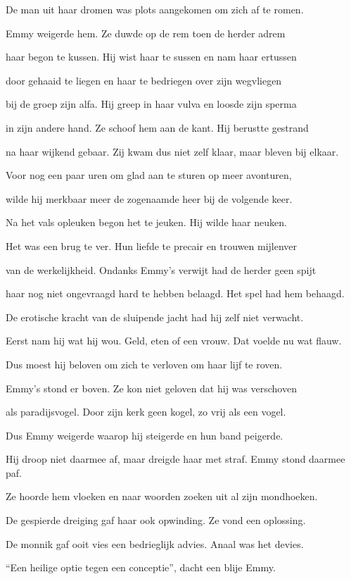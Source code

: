 De man uit haar dromen
was plots aangekomen
om zich af te romen.

Emmy weigerde hem.
Ze duwde op de rem
toen de herder adrem

haar begon te kussen.
Hij wist haar te sussen
en nam haar ertussen

door gehaaid te liegen
en haar te bedriegen
over zijn wegvliegen

bij de groep zijn alfa.
Hij greep in haar vulva
en loosde zijn sperma

in zijn andere hand.
Ze schoof hem aan de kant.
Hij berustte gestrand

na haar wijkend gebaar.
Zij kwam dus niet zelf klaar,
maar bleven bij elkaar.

Voor nog een paar uren
om glad aan te sturen
op meer avonturen,

wilde hij merkbaar meer
de zogenaamde heer
bij de volgende keer.

Na het vals opleuken
begon het te jeuken.
Hij wilde haar neuken.

Het was een brug te ver.
Hun liefde te precair
en trouwen mijlenver

van de werkelijkheid.
Ondanks Emmy’s verwijt
had de herder geen spijt

haar nog niet ongevraagd
hard te hebben belaagd.
Het spel had hem behaagd.

De erotische kracht
van de sluipende jacht
had hij zelf niet verwacht.

Eerst nam hij wat hij wou.
Geld, eten of een vrouw.
Dat voelde nu wat flauw.

Dus moest hij beloven
om zich te verloven
om haar lijf te roven.

Emmy’s stond er boven.
Ze kon niet geloven
dat hij was verschoven

als paradijsvogel.
Door zijn kerk geen kogel,
zo vrij als een vogel.

Dus Emmy weigerde
waarop hij steigerde
en hun band peigerde.

Hij droop niet daarmee af,
maar dreigde haar met straf.
Emmy stond daarmee paf.

Ze hoorde hem vloeken
en naar woorden zoeken
uit al zijn mondhoeken.

De gespierde dreiging
gaf haar ook opwinding.
Ze vond een oplossing.

De monnik gaf ooit vies
een bedrieglijk advies.
Anaal was het devies.

“Een heilige optie
tegen een conceptie”,
dacht een blije Emmy.

